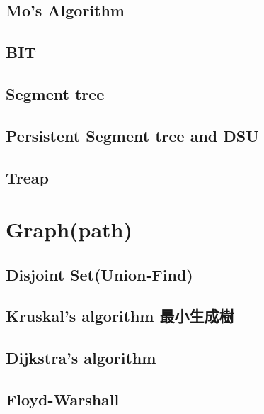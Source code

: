 \subsection{Mo's Algorithm}


\subsection{BIT}


\subsection{Segment tree}


\subsection{Persistent Segment tree and DSU}


\subsection{Treap}


\section{Graph(path)}

\subsection{Disjoint Set(Union-Find)}


\subsection{Kruskal’s algorithm 最小生成樹}


\subsection{Dijkstra’s algorithm}


\subsection{Floyd-Warshall}


